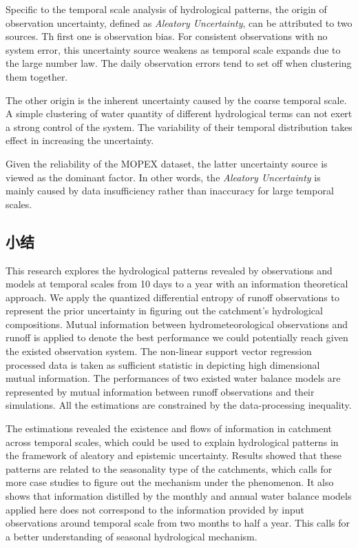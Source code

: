 Specific to the temporal scale analysis of hydrological patterns, the origin of observation uncertainty, defined as \emph{Aleatory Uncertainty}, can be attributed to two sources. Th first one is  observation bias. For consistent observations with no system error, this uncertainty source  weakens as temporal scale expands  due to the large number law. The daily observation errors tend to set off when clustering them together. 

The other origin is the inherent uncertainty caused by the coarse temporal scale. A simple clustering of water quantity of different hydrological terms can not exert a strong control of the system. The variability of their temporal distribution takes effect in increasing the uncertainty. 

Given the reliability of the MOPEX dataset, the latter uncertainty source is viewed as the dominant factor. In other words, the \emph{Aleatory Uncertainty} is mainly caused by data insufficiency rather than inaccuracy for large temporal scales.


 
\subsection{小结}
This research explores the hydrological patterns revealed by observations and models at temporal scales from 10 days to a year with an information theoretical approach. We apply the quantized differential entropy of runoff observations to represent the prior uncertainty in figuring out the catchment's hydrological compositions. Mutual information between hydrometeorological observations and runoff is applied to denote the best performance we could potentially reach given the existed observation system. The non-linear support vector regression processed data is taken as sufficient statistic in depicting  high dimensional mutual information.
The performances of two existed water balance models are represented by mutual information between runoff observations and their simulations. All the estimations are constrained by the  data-processing inequality. 

The estimations revealed the existence and flows of information in catchment across temporal scales, which could be used to explain hydrological patterns in the framework of aleatory and epistemic uncertainty. Results showed that these patterns are related to the seasonality type of the catchments, which calls for more case studies to figure out the mechanism under the phenomenon. It also shows that information distilled by the monthly and annual water balance models applied here does not correspond to the information provided by input observations around temporal scale from two months to half a year. This calls for a better understanding of seasonal hydrological mechanism. 


